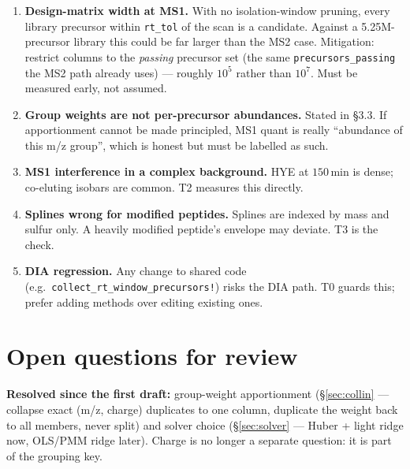 \documentclass[11pt]{article}
\newcommand{\code}[1]{\texttt{\small #1}}
\begin{document}
\begin{enumerate}[nosep]
  \item \textbf{Design-matrix width at MS1.} With no isolation-window pruning, every library
        precursor within \code{rt\_tol} of the scan is a candidate. Against a 5.25M-precursor
        library this could be far larger than the MS2 case. Mitigation: restrict columns to the
        \emph{passing} precursor set (the same \code{precursors\_passing} the MS2 path already
        uses) --- roughly $10^5$ rather than $10^7$. Must be measured early, not assumed.
  \item \textbf{Group weights are not per-precursor abundances.} Stated in \S3.3. If
        apportionment cannot be made principled, MS1 quant is really
        ``abundance of this m/z group'', which is honest but must be labelled as such.
  \item \textbf{MS1 interference in a complex background.} HYE at $150$\,min is dense; co-eluting
        isobars are common. T2 measures this directly.
  \item \textbf{Splines wrong for modified peptides.} Splines are indexed by mass and sulfur only.
        A heavily modified peptide's envelope may deviate. T3 is the check.
  \item \textbf{DIA regression.} Any change to shared code (e.g.\ \code{collect\_rt\_window\_precursors!})
        risks the DIA path. T0 guards this; prefer adding methods over editing existing ones.
\end{enumerate}

\section{Open questions for review}
\label{sec:open}

\textbf{Resolved since the first draft:} group-weight apportionment (\S\ref{sec:collin} ---
collapse exact (m/z, charge) duplicates to one column, duplicate the weight back to all members,
never split) and solver choice (\S\ref{sec:solver} --- Huber + light ridge now, OLS/PMM ridge
later). Charge is no longer a separate question: it is part of the grouping key.
\end{document}
